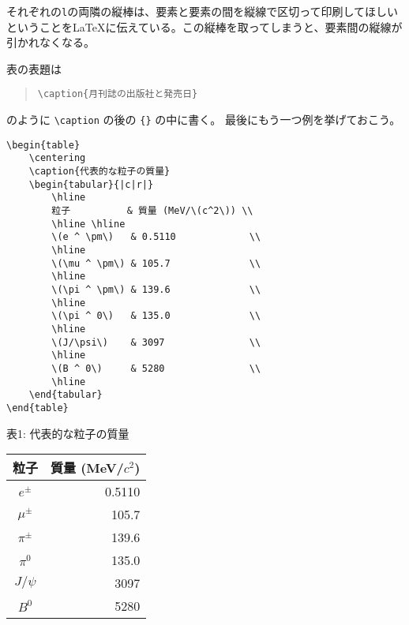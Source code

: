 それぞれの\texttt{l}の両隣の縦棒は、要素と要素の間を縦線で区切って印刷してほしいということを\LaTeX に伝えている。この縦棒を取ってしまうと、要素間の縦線が引かれなくなる。

表の表題は
\begin{quotation}
    \verb|\caption{月刊誌の出版社と発売日}|
\end{quotation}
のように \verb|\caption| の後の \verb|{}| の中に書く。
最後にもう一つ例を挙げておこう。
\begin{reidai}
    \begin{verbatim}
\begin{table}
    \centering
    \caption{代表的な粒子の質量}
    \begin{tabular}{|c|r|}
        \hline
        粒子          & 質量 (MeV/\(c^2\)) \\
        \hline \hline
        \(e ^ \pm\)   & 0.5110             \\
        \hline
        \(\mu ^ \pm\) & 105.7              \\
        \hline
        \(\pi ^ \pm\) & 139.6              \\
        \hline
        \(\pi ^ 0\)   & 135.0              \\
        \hline
        \(J/\psi\)    & 3097               \\
        \hline
        \(B ^ 0\)     & 5280               \\
        \hline
    \end{tabular}
\end{table}
\end{verbatim}
\end{reidai}
\vspace*{-1.5em}
\begin{kekka}
    \centering
    表1: 代表的な粒子の質量 \\
    \begin{tabular}{|c|r|}
        \hline
        粒子          & 質量 (MeV/\(c^2\)) \\
        \hline \hline
        \(e ^ \pm\)   & 0.5110             \\
        \hline
        \(\mu ^ \pm\) & 105.7              \\
        \hline
        \(\pi ^ \pm\) & 139.6              \\
        \hline
        \(\pi ^ 0\)   & 135.0              \\
        \hline
        \(J/\psi\)    & 3097               \\
        \hline
        \(B ^ 0\)     & 5280               \\
        \hline
    \end{tabular}
\end{kekka}

